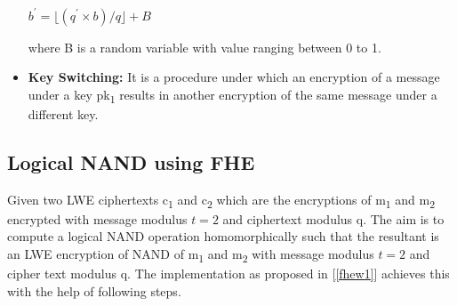 \begin{itemize}
\hspace{3cm}$b^{'}=\lfloor{(q^{'}\times b)/q}\rfloor +B$

where B is a random variable with value ranging between 0 to 1.
\item
\textbf{Key Switching:} It is a procedure under which an encryption of a message under a key pk\textsubscript{1} results in another encryption of the same message under a different key. 
\end{itemize}
\subsection{Logical NAND using FHE} \label{3.1.2}
Given two LWE ciphertexts c\textsubscript{1} and c\textsubscript{2} which are the encryptions of m\textsubscript{1} and m\textsubscript{2} encrypted with message modulus $t=2$ and ciphertext modulus q. The aim is to compute a logical NAND operation homomorphically such that the resultant is an LWE encryption of NAND of m\textsubscript{1} and m\textsubscript{2} with message modulus $t=2$ and cipher text modulus q. The implementation as proposed in [\ref{fhew1}] achieves this with the help of following steps.

